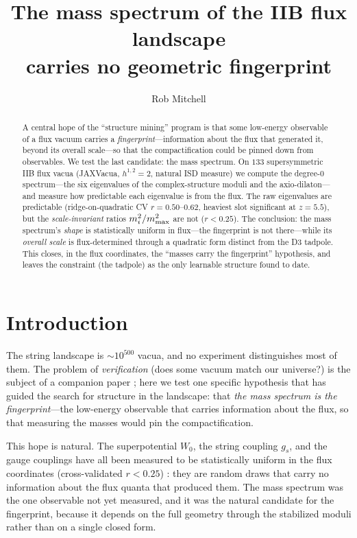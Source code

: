 \documentclass[11pt]{article}
\title{The mass spectrum of the IIB flux landscape\\ carries no geometric fingerprint}
\author{Rob Mitchell}
\date{}
\begin{document}
\maketitle

\begin{abstract}
A central hope of the ``structure mining'' program is that some low-energy
observable of a flux vacuum carries a \emph{fingerprint}---information about the
flux that generated it, beyond its overall scale---so that the compactification
could be pinned down from observables. We test the last candidate: the mass
spectrum. On $133$ supersymmetric IIB flux vacua (JAXVacua, $h^{1,2}=2$, natural
ISD measure) we compute the degree-$0$ spectrum---the six eigenvalues of the
complex-structure moduli and the axio-dilaton---and measure how predictable each
eigenvalue is from the flux. The raw eigenvalues are predictable
(ridge-on-quadratic CV $r = 0.50$--$0.62$, heaviest slot significant at
$z=5.5$), but the \emph{scale-invariant} ratios $m^2_i / m^2_{\rm max}$ are not
($r < 0.25$). The conclusion: the mass spectrum's \emph{shape} is statistically
uniform in flux---the fingerprint is not there---while its \emph{overall scale}
is flux-determined through a quadratic form distinct from the D3 tadpole. This
closes, in the flux coordinates, the ``masses carry the fingerprint'' hypothesis,
and leaves the constraint (the tadpole) as the only learnable structure found to
date.
\end{abstract}

\section{Introduction}

The string landscape is $\sim 10^{500}$ vacua, and no experiment distinguishes
most of them. The problem of \emph{verification} (does some vacuum match our
universe?) is the subject of a companion paper \cite{pacland}; here we test one
specific hypothesis that has guided the search for structure in the landscape:
that \emph{the mass spectrum is the fingerprint}---the low-energy observable
that carries information about the flux, so that measuring the masses would pin
the compactification.

This hope is natural. The superpotential $W_0$, the string coupling $g_s$, and
the gauge couplings have all been measured to be statistically uniform in the
flux coordinates (cross-validated $r < 0.25$) \cite{pacland}: they are random
draws that carry no information about the flux quanta that produced them. The
mass spectrum was the one observable not yet measured, and it was the natural
candidate for the fingerprint, because it depends on the full geometry through
the stabilized moduli rather than on a single closed form.
\end{document}
